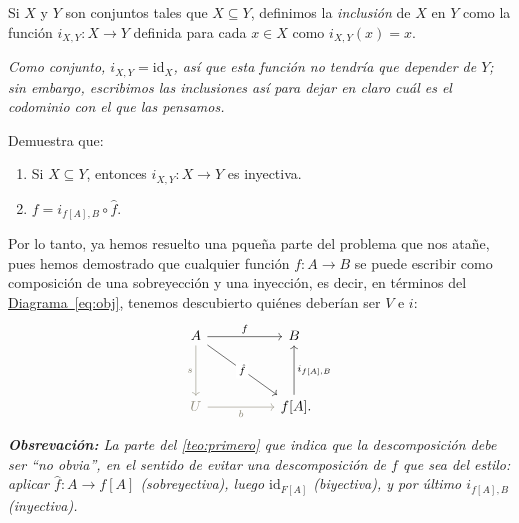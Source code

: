 \documentclass[letterpaper,DIV=14,headsepline,12pt]{scrartcl}
\newcommand{\pts}{}
\newenvironment{ejercicio}[1]{\ifthenelse{\equal{#1}{1} \OR
\equal{#1}{+1}}{\renewcommand{\pts}{\textbf{(#1
pt)}}}{\renewcommand{\pts}{\textbf{(#1 pts)}}}\begin{ejj}\upshape
\pts}{\end{ejj}}
\newcommand{\id}{\mathrm{id}} \newcommand{\op}{{}^{\mathrm{op}}}
\begin{document}
    \begin{definicion}
        Si $X$ y $Y$ son conjuntos tales que $X \subseteq Y$, definimos la
        \textit{inclusión} de $X$ en $Y$ como la función $i_{X,Y}\colon X \to Y$
        definida para cada $x \in X$ como $i_{X,Y}(x) = x$.

        \textit{Como conjunto, $i_{X,Y}=\id_X$, así que esta función no tendría
        que depender de $Y$; sin embargo, escribimos las inclusiones así para
        dejar en claro cuál es el codominio con el que las pensamos.}
    \end{definicion}

    \begin{ejercicio}{1.5}
        Demuestra que:
        \begin{enumerate}
            \item Si $X \subseteq Y$, entonces $i_{X,Y}\colon X \to Y$ es inyectiva.
            \item $f=i_{f[A],B} \circ \hat{f}$.
        \end{enumerate}
    \end{ejercicio}

    Por lo tanto, ya hemos resuelto una pqueña parte del problema que nos atañe,
    pues hemos demostrado que cualquier función $f\colon A \to B$ se puede escribir
    como composición de una sobreyección y una inyección, es decir, en términos
    del \hyperref[eq:obj]{Diagrama~\ref*{eq:obj}}, tenemos descubierto quiénes
    deberían ser $V$ e $i$:
    \begin{equation}\label{eq:hat}
        \begin{tikzcd}
            A && B \\
            \\
            \textcolor{Cornsilk4}{U} && {f[A]}\mathrlap{.}
            \arrow["f", from=1-1, to=1-3]
            \arrow["s"', from=1-1, to=3-1, draw=Cornsilk4, text=Cornsilk4]
            \arrow["{\hat{f}}"{description}, from=1-1, to=3-3]
            \arrow["b"', from=3-1, to=3-3, draw=Cornsilk4, text=Cornsilk4]
            \arrow["{i_{f[A],B}}"', from=3-3, to=1-3]
        \end{tikzcd}
    \end{equation}

    \textit{\textbf{Obsrevación:} La parte del \autoref{teo:primero} que indica que la descomposición
    debe ser ``no obvia'', en el sentido de evitar una descomposición de $f$ que sea del estilo: aplicar
    $\hat{f}:A \to f[A]$ (sobreyectiva), luego $\id_{F[A]}$ (biyectiva), y por último $i_{f[A],B}$ (inyectiva).}
\end{document}
